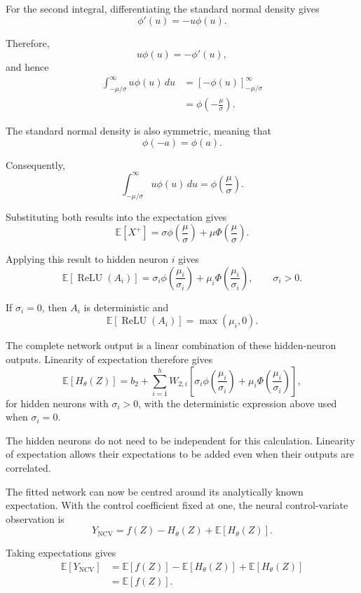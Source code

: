 For the second integral, differentiating the standard normal density gives
\[
\phi'(u)=-u\phi(u).
\]

Therefore,
\[
u\phi(u)=-\phi'(u),
\]
and hence
\[
\begin{aligned}
\int_{-\mu/\sigma}^{\infty}
u\phi(u)\,du
&=
\left[
-\phi(u)
\right]_{-\mu/\sigma}^{\infty} \\
&=
\phi\left(-\frac{\mu}{\sigma}\right).
\end{aligned}
\]

The standard normal density is also symmetric, meaning that
\[
\phi(-a)=\phi(a).
\]

Consequently,
\[
\int_{-\mu/\sigma}^{\infty}
u\phi(u)\,du
=
\phi\left(\frac{\mu}{\sigma}\right).
\]

Substituting both results into the expectation gives
\[
\mathbb{E}[X^+]
=
\sigma
\phi\left(\frac{\mu}{\sigma}\right)
+
\mu
\Phi\left(\frac{\mu}{\sigma}\right).
\]

Applying this result to hidden neuron \(i\) gives
\[
\mathbb{E}
\left[
\operatorname{ReLU}(A_i)
\right]
=
\sigma_i
\phi\left(\frac{\mu_i}{\sigma_i}\right)
+
\mu_i
\Phi\left(\frac{\mu_i}{\sigma_i}\right),
\qquad
\sigma_i>0.
\]

If \(\sigma_i=0\), then \(A_i\) is deterministic and
\[
\mathbb{E}
\left[
\operatorname{ReLU}(A_i)
\right]
=
\max(\mu_i,0).
\]

The complete network output is a linear combination of these hidden-neuron outputs. Linearity of expectation therefore gives
\[
\mathbb{E}
\left[
H_\theta(Z)
\right]
=
b_2
+
\sum_{i=1}^{h}
W_{2,i}
\left[
\sigma_i
\phi\left(\frac{\mu_i}{\sigma_i}\right)
+
\mu_i
\Phi\left(\frac{\mu_i}{\sigma_i}\right)
\right],
\]
for hidden neurons with \(\sigma_i>0\), with the deterministic expression above used when \(\sigma_i=0\).

The hidden neurons do not need to be independent for this calculation. Linearity of expectation allows their expectations to be added even when their outputs are correlated.

The fitted network can now be centred around its analytically known expectation. With the control coefficient fixed at one, the neural control-variate observation is
\[
Y_{\mathrm{NCV}}
=
f(Z)-H_\theta(Z)+\mathbb{E}[H_\theta(Z)].
\]

Taking expectations gives
\[
\begin{aligned}
\mathbb{E}
\left[
Y_{\mathrm{NCV}}
\right]
&=
\mathbb{E}[f(Z)]
-
\mathbb{E}[H_\theta(Z)]
+
\mathbb{E}[H_\theta(Z)] \\
&=
\mathbb{E}[f(Z)].
\end{aligned}
\]

